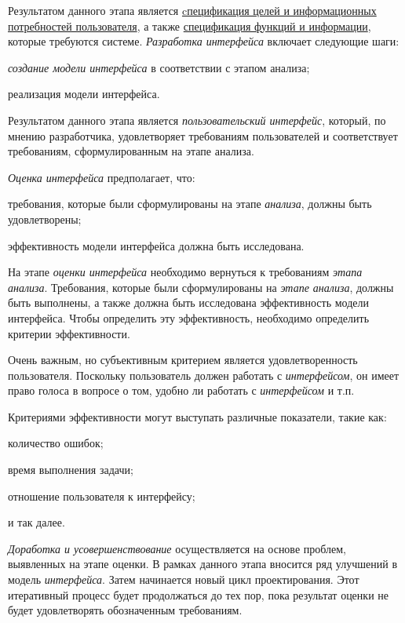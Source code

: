 Результатом данного этапа является \uline{cпецификация целей и информационных потребностей пользователя}, а также
\uline{спецификация функций и информации}, которые требуются системе.
\textit{Разработка интерфейса} включает следующие шаги:
\begin{textitemize}
	\item \textit{создание модели интерфейса} в соответствии с этапом анализа;
	\item реализация модели интерфейса.
\end{textitemize}

Результатом данного этапа является \textit{пользовательский интерфейс}, который, по мнению разработчика, удовлетворяет требованиям пользователей и соответствует требованиям, сформулированным на этапе анализа.

\textit{Оценка интерфейса} предполагает, что:
\begin{textitemize}
	\item требования, которые были сформулированы на этапе \textit{анализа}, должны быть удовлетворены;
	\item эффективность модели интерфейса должна быть исследована.
\end{textitemize}

На этапе \textit{оценки интерфейса} необходимо вернуться к требованиям \textit{этапа анализа}. Требования, которые
были сформулированы на \textit{этапе анализа}, должны быть выполнены, а также должна быть исследована эффективность модели интерфейса.
Чтобы определить эту эффективность, необходимо определить критерии эффективности.

Очень важным, но субъективным критерием является удовлетворенность пользователя. Поскольку пользователь должен работать с \textit{интерфейсом}, он имеет право голоса в вопросе о том, удобно ли работать с \textit{интерфейсом} и т.п.

Критериями эффективности могут выступать различные показатели, такие как:
\begin{textitemize}
	\item количество ошибок;
	\item время выполнения задачи;
	\item отношение пользователя к интерфейсу;
	\item и так далее.
\end{textitemize}

\textit{Доработка и усовершенствование} осуществляется на основе проблем, выявленных на этапе оценки. В рамках данного этапа вносится ряд улучшений в модель \textit{интерфейса}. Затем начинается новый цикл проектирования. Этот итеративный процесс будет продолжаться до тех пор, пока результат оценки не будет удовлетворять обозначенным требованиям. 

